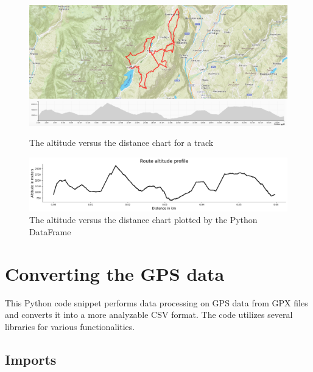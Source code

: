 \begin{figure}[htb]
    \centering

    \begin{minipage}{\textwidth}
        \centering
        \includegraphics[width=\textwidth]{resources/track-gpx.png}
        \caption{The altitude versus the distance chart for a track}
        \label{fig:track-gpx}
    \end{minipage}%

    \begin{minipage}{\textwidth}
        \centering
        \includegraphics[width=\textwidth]{resources/track-csv.png}
        \caption{The altitude versus the distance chart plotted by the Python DataFrame}
        \label{fig:track-csv}
    \end{minipage}


\end{figure}



\section{Converting the GPS data}
\label{sec:data-gps}

This Python code snippet performs data processing on GPS data from GPX files and converts it into 
a more analyzable CSV format. The code utilizes several libraries for various functionalities.

\subsection{Imports}

